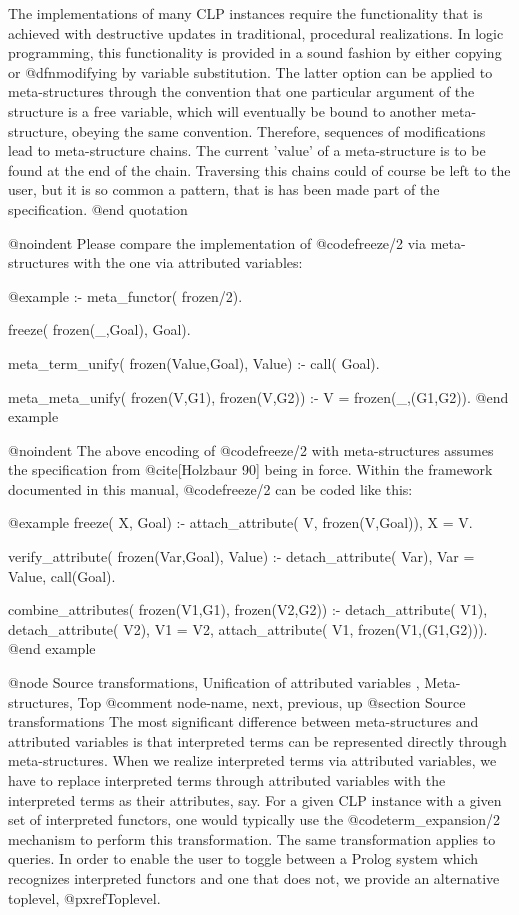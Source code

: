 The implementations of many CLP instances require the functionality that
is achieved with destructive updates in traditional, procedural
realizations.  In logic programming, this functionality is provided in a
sound fashion by either copying or @dfn{modifying by variable
substitution}.  The latter option can be applied to meta-structures
through the convention that one particular argument of the structure is
a free variable, which will eventually be bound to another
meta-structure, obeying the same convention.  Therefore, sequences of
modifications lead to meta-structure chains. The current 'value' of a
meta-structure is to be found at the end of the chain.  Traversing this
chains could of course be left to the user, but it is so common a
pattern, that is has been made part of the specification.
@end quotation

@noindent
Please compare the implementation of @code{freeze/2} via
meta-structures with the one via attributed variables:

@example
:- meta_functor( frozen/2). 
   
freeze( frozen(_,Goal), Goal).
   
meta_term_unify( frozen(Value,Goal), Value) :- 
  call( Goal).

meta_meta_unify( frozen(V,G1), frozen(V,G2)) :- 
  V = frozen(_,(G1,G2)).
@end example

@noindent
The above encoding of @code{freeze/2} with meta-structures assumes the
specification from @cite{[Holzbaur 90]} being in force.
Within the framework documented in this manual, @code{freeze/2} can be
coded like this:

@example
freeze( X, Goal) :-
  attach_attribute( V, frozen(V,Goal)),
  X = V.

verify_attribute( frozen(Var,Goal), Value) :-
  detach_attribute( Var),
  Var = Value, 
  call(Goal).

combine_attributes( frozen(V1,G1), frozen(V2,G2)) :-
  detach_attribute( V1),
  detach_attribute( V2),
  V1 = V2,
  attach_attribute( V1, frozen(V1,(G1,G2))).
@end example

@node Source transformations,  Unification of attributed variables , Meta-structures, Top    
@comment  node-name,  next,  previous,  up
@section Source transformations
The most significant difference between meta-structures and attributed
variables is that interpreted terms can be represented directly through
meta-structures. When we realize interpreted terms via attributed
variables, we have to replace interpreted terms through attributed
variables with the interpreted terms as their attributes, say.
For a given CLP instance with a given set of interpreted functors, one
would typically use the @code{term_expansion/2} mechanism to perform
this transformation. The same transformation applies to queries.
In order to enable the user to toggle between a Prolog system which
recognizes interpreted functors and one that does not, we provide an
alternative toplevel, @pxref{Toplevel}.

